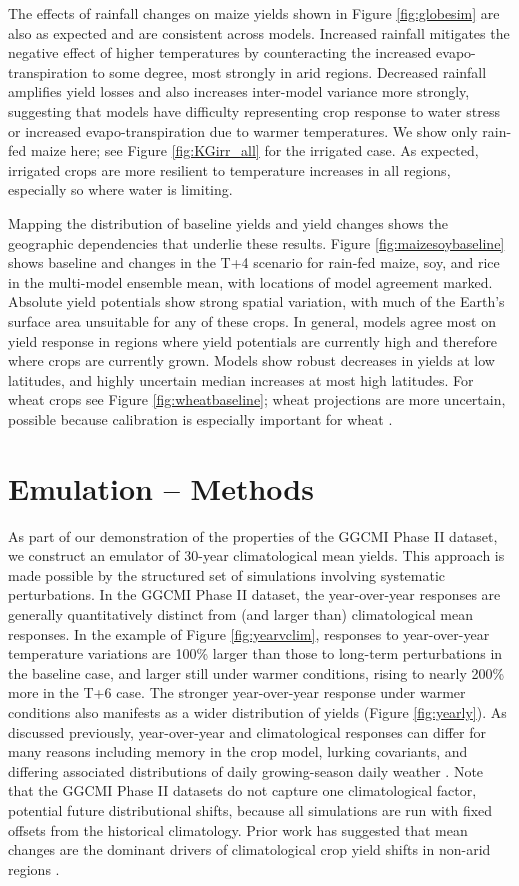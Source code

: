 \documentclass[preprint, 5p, times, twocolumn]{elsarticle}
\begin{document}
The effects of rainfall changes on maize yields shown in Figure \ref{fig:globesim} are also as expected and are consistent across models. Increased rainfall mitigates the negative effect of higher temperatures by counteracting the increased evapo-transpiration to some degree, most strongly in arid regions. Decreased rainfall amplifies yield losses and also increases inter-model variance more strongly, suggesting that models have difficulty representing crop response to water stress or increased evapo-transpiration due to warmer temperatures.  We show only rain-fed maize here; see Figure \ref{fig:KGirr_all} for the irrigated case. As expected, irrigated crops are more resilient to temperature increases in all regions, especially so where water is limiting.  

Mapping the distribution of baseline yields and yield changes shows the geographic dependencies that underlie these results. Figure \ref{fig:maizesoybaseline} shows baseline and changes in the T+4 scenario for rain-fed maize, soy, and rice in the multi-model ensemble mean, with locations of model agreement marked. Absolute yield potentials show strong spatial variation, with much of the Earth's surface area unsuitable for any of these crops. In general, models agree most on yield response in regions where yield potentials are currently high and therefore where crops are currently grown. Models show robust decreases in yields at low latitudes, and highly uncertain median increases at most high latitudes. For wheat crops see Figure \ref{fig:wheatbaseline}; wheat projections are more uncertain, possible because calibration is especially important for wheat \citep[e.g.][]{Asseng2013}.

\section{Emulation -- Methods}
\label{S:4}
As part of our demonstration of the properties of the GGCMI Phase II dataset, we construct an emulator of 30-year climatological mean yields. This approach is made possible by the structured set of simulations involving systematic perturbations. In the GGCMI Phase II dataset, the year-over-year responses are generally quantitatively distinct from (and larger than) climatological mean responses. In the example of Figure \ref{fig:yearvclim}, responses to year-over-year temperature variations are 100\% larger than those to long-term perturbations in the baseline case, and larger still under warmer conditions, rising to nearly 200\% more in the T+6 case. The stronger year-over-year response under warmer conditions also manifests as a wider distribution of yields (Figure \ref{fig:yearly}). As discussed previously, year-over-year and climatological responses can differ for many reasons including memory in the crop model, lurking covariants, and differing associated distributions of daily growing-season daily weather \citep[e.g.][]{Ruane2016}. Note that the GGCMI Phase II datasets do not capture one climatological factor, potential future distributional shifts, because all simulations are run with fixed offsets from the historical climatology. Prior work has suggested that mean changes are the dominant drivers of climatological crop yield shifts in non-arid regions \citep[e.g.][]{Glotter14}. 
\end{document}
